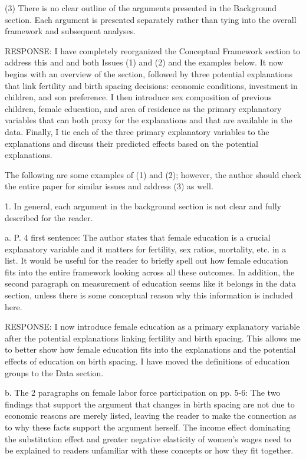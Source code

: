 \documentclass[letterpaper,12pt]{article}
\begin{document}
(3) There is no clear outline of the arguments presented in the Background section. Each
argument is presented separately rather than tying into the overall framework and
subsequent analyses.

RESPONSE: I have completely reorganized the Conceptual Framework section to address this and
and both Issues (1) and (2) and the examples below.
It now begins with an overview of the section, followed by three potential explanations that
link fertility and birth spacing decisions: economic conditions, investment in children, and 
son preference.
I then introduce sex composition of previous children, female education, and area of
residence as the primary explanatory variables that can both proxy for the explanations and
that are available in the data.
Finally, I tie each of the three primary explanatory variables to the explanations and
discuss their predicted effects based on the potential explanations.



The following are some examples of (1) and (2); however, the author should check the entire
paper for similar issues and address (3) as well.

1. In general, each argument in the background section is not clear and fully described for
the reader.

a. P. 4 first sentence: The author states that female education is a crucial explanatory
variable and it matters for fertility, sex ratios, mortality, etc. in a list. It would be
useful for the reader to briefly spell out how female education fits into the entire
framework looking across all these outcomes. In addition, the second paragraph on
measurement of education seems like it belongs in the data section, unless there is some
conceptual reason why this information is included here.

RESPONSE: I now introduce female education as a primary explanatory variable after the 
potential explanations linking fertility and birth spacing.
This allows me to better show how female education fits into the explanations and the potential 
effects of education on birth spacing.
I have moved the definitions of education groups to the Data section.

b. The 2 paragraphs on female labor force participation on pp. 5-6: The two findings that
support the argument that changes in birth spacing are not due to economic reasons are
merely listed, leaving the reader to make the connection as to why these facts support the
argument herself. The income effect dominating the substitution effect and greater negative
elasticity of women’s wages need to be explained to readers unfamiliar with these concepts
or how they fit together.
\end{document}
